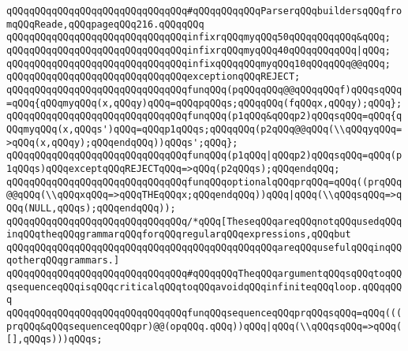 \newline
\verb|qQQqqQQqqQQqqQQqqQQqqQQqqQQqqQQq#qQQqqQQqqQQqParserqQQqbuildersqQQqfromqQQqReade,qQQqpageqQQq216.qQQqqQQq|\newline
\newline
\verb|qQQqqQQqqQQqqQQqqQQqqQQqqQQqqQQqinfixrqQQqmyqQQq50qQQqqQQqqQQq&qQQq;|\newline
\verb|qQQqqQQqqQQqqQQqqQQqqQQqqQQqqQQqinfixrqQQqmyqQQq40qQQqqQQqqQQq|\verb#|qQQq;#\newline
\verb|qQQqqQQqqQQqqQQqqQQqqQQqqQQqqQQqinfixqQQqqQQqmyqQQq10qQQqqQQq@@qQQq;|\newline
\newline
\verb|qQQqqQQqqQQqqQQqqQQqqQQqqQQqqQQqexceptionqQQqREJECT;|\newline
\newline
\verb|qQQqqQQqqQQqqQQqqQQqqQQqqQQqqQQqfunqQQq(pqQQqqQQq@@qQQqqQQqf)qQQqsqQQq=qQQq{qQQqmyqQQq(x,qQQqy)qQQq=qQQqpqQQqs;qQQqqQQq(fqQQqx,qQQqy);qQQq};|\newline
\newline
\verb|qQQqqQQqqQQqqQQqqQQqqQQqqQQqqQQqfunqQQq(p1qQQq&qQQqp2)qQQqsqQQq=qQQq{qQQqmyqQQq(x,qQQqs')qQQq=qQQqp1qQQqs;qQQqqQQq(p2qQQq@@qQQq(\\qQQqyqQQq=>qQQq(x,qQQqy);qQQqendqQQq))qQQqs';qQQq};|\newline
\verb|qQQqqQQqqQQqqQQqqQQqqQQqqQQqqQQqfunqQQq(p1qQQq|\verb#|qQQqp2)qQQqsqQQq=qQQq(p1qQQqs)qQQqexceptqQQqREJECTqQQq=>qQQq(p2qQQqs);qQQqendqQQq;#\newline
\newline
\verb|qQQqqQQqqQQqqQQqqQQqqQQqqQQqqQQqfunqQQqoptionalqQQqprqQQq=qQQq((prqQQq@@qQQq(\\qQQqxqQQq=>qQQqTHEqQQqx;qQQqendqQQq))qQQq|\verb#|qQQq(\\qQQqsqQQq=>qQQq(NULL,qQQqs);qQQqendqQQq));#\newline
\newline
\verb|qQQqqQQqqQQqqQQqqQQqqQQqqQQqqQQq/*qQQq[TheseqQQqareqQQqnotqQQqusedqQQqinqQQqtheqQQqgrammarqQQqforqQQqregularqQQqexpressions,qQQqbut|\newline
\verb|qQQqqQQqqQQqqQQqqQQqqQQqqQQqqQQqqQQqqQQqqQQqqQQqareqQQqusefulqQQqinqQQqotherqQQqgrammars.]|\newline
\verb|qQQqqQQqqQQqqQQqqQQqqQQqqQQqqQQq#qQQqqQQqTheqQQqargumentqQQqsqQQqtoqQQqsequenceqQQqisqQQqcriticalqQQqtoqQQqavoidqQQqinfiniteqQQqloop.qQQqqQQq|\newline
\verb|qQQqqQQqqQQqqQQqqQQqqQQqqQQqqQQqfunqQQqsequenceqQQqprqQQqsqQQq=qQQq(((prqQQq&qQQqsequenceqQQqpr)@@(opqQQq.qQQq))qQQq|\verb#|qQQq(\\qQQqsqQQq=>qQQq([],qQQqs)))qQQqs;#\newline
